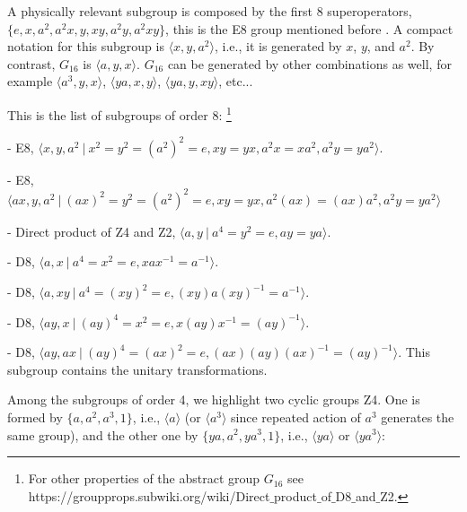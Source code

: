 {A physically relevant subgroup is composed by  the first 8 superoperators, $\{e, x, a^{2}, a^{2}x, y, xy, a^{2}y, a^{2}xy\}$, this is the E8 group mentioned before \cite{Simon2019a}.
A compact notation for this subgroup is $\langle x, y, a^2 \rangle$, i.e.,
it is generated by $x$, $y$, and $a^2$. By contrast,  $G_{16}$ is $\langle a,y,x\rangle$.
$G_{16}$ can be generated by other combinations as well, for example $\langle a^3,y,x\rangle$,  $\langle ya,x,y\rangle$, $\langle ya, y, xy\rangle$, etc...



This is the list of subgroups of order 8: \footnote{For other  properties of the abstract group $G_{16}$ see\\
https://groupprops.subwiki.org/wiki/Direct$\_$product$\_$of$\_$D8$\_$and$\_$Z2.}


- E8, $\langle  x, y, a^{2} \ | \ x^{2}=y^{2}=(a^{2})^{2}=e, xy=yx, a^{2}x=xa^{2}, a^{2}y=ya^{2} \rangle$.

- E8, $\langle  ax, y, a^{2} \ | \ (ax)^{2}=y^{2}=(a^{2})^{2}=e, xy=yx, a^{2}(ax)=(ax)a^{2}, a^{2}y=ya^{2} \rangle$

- Direct product of Z4 and Z2, $\langle  a, y \ | \ a^{4}=y^{2}=e, ay=ya \rangle$.

- D8, $\langle a,x \ | \ a^{4}=x^{2}=e, xax^{-1}=a^{-1} \rangle$.

- D8, $\langle a,xy \ | \ a^{4}=(xy)^{2}=e, (xy)a(xy)^{-1}=a^{-1} \rangle$.

- D8, $\langle ay,x \ | \ (ay)^{4}=x^{2}=e, x(ay)x^{-1}=(ay)^{-1} \rangle$.

- D8, $\langle ay,ax \ | \ (ay)^{4}=(ax)^{2}=e, (ax)(ay)(ax)^{-1}=(ay)^{-1} \rangle$. This subgroup contains the unitary transformations.



Among the subgroups of order 4, we highlight  two cyclic groups Z4.
One is formed by  $\{a, a^2, a^3, 1\}$, i.e., $\langle a\rangle$ (or  $\langle a^3\rangle$ since repeated action of $a^3$ generates the same group), and the other one by
$\{ya, a^2, ya^3, 1\}$, i.e., $\langle ya \rangle$ or   $\langle ya^3\rangle$:

}
